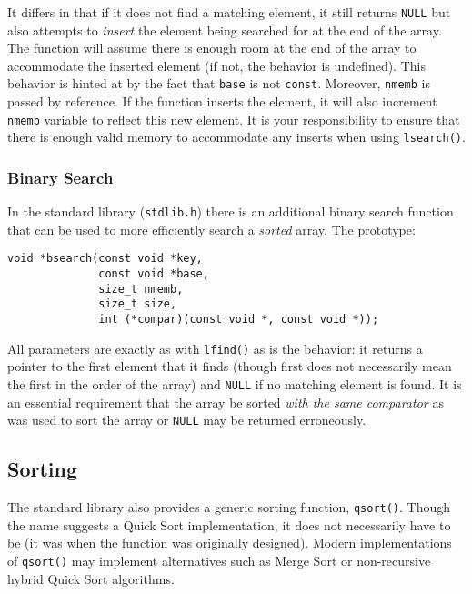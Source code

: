 It differs in that if it does not find a matching element, it still 
returns \texttt{NULL} but also attempts to \emph{insert} the element 
being searched for at the end of the array.  The function will assume there 
is enough room at the end of the array to accommodate the inserted element 
(if not, the behavior is undefined).  This behavior is hinted at by the
fact that \texttt{base} is not \texttt{const}.  Moreover, 
\texttt{nmemb} is passed by reference.  If the function inserts the
element, it will also increment \texttt{nmemb} variable to reflect
this new element.  It is your responsibility to ensure that there is enough 
valid memory to accommodate any inserts when using \texttt{lsearch()}.

\subsubsection{Binary Search}

In the standard library (\texttt{stdlib.h}) there is an additional binary
search function that can be used to more efficiently search a \emph{sorted}
array.  The prototype:

\begin{verbatim}
void *bsearch(const void *key, 
              const void *base, 
              size_t nmemb, 
              size_t size, 
              int (*compar)(const void *, const void *));
\end{verbatim}

All parameters are exactly as with \texttt{lfind()} as is the behavior:
it returns a pointer to the first element that it finds (though first does not  
necessarily mean the first in the order of the array) and \texttt{NULL} if 
no matching element is found. It is an essential requirement that the array 
be sorted \emph{with the same comparator} as was used to sort the array or \texttt{NULL} may be 
returned erroneously.

\subsection{Sorting}

The standard library also provides a generic sorting
function, \texttt{qsort()}.  Though the name suggests a Quick Sort implementation, it does not necessarily have to be (it was when the function 
was originally
designed).  Modern implementations of \texttt{qsort()} may implement 
alternatives such as Merge Sort or non-recursive hybrid Quick Sort algorithms.

